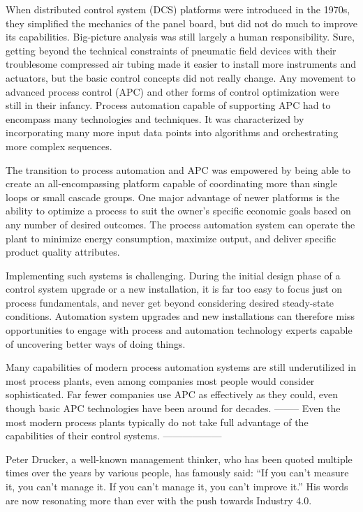 When distributed control system (DCS) platforms were introduced in the 1970s, they simplified the mechanics of the panel board, but did not do much to improve its capabilities. Big-picture analysis was still largely a human responsibility. Sure, getting beyond the technical constraints of pneumatic field devices with their troublesome compressed air tubing made it easier to install more instruments and actuators, but the basic control concepts did not really change. Any movement to advanced process control (APC) and other forms of control optimization were still in their infancy. Process automation capable of supporting APC had to encompass many technologies and techniques. It was characterized by incorporating many more input data points into algorithms and orchestrating more complex sequences.


The transition to process automation and APC was empowered by being able to create an all-encompassing platform capable of coordinating more than single loops or small cascade groups. One major advantage of newer platforms is the ability to optimize a process to suit the owner’s specific economic goals based on any number of desired outcomes. The process automation system can operate the plant to minimize energy consumption, maximize output, and deliver specific product quality attributes.

Implementing such systems is challenging. During the initial design phase of a control system upgrade or a new installation, it is far too easy to focus just on process fundamentals, and never get beyond considering desired steady-state conditions. Automation system upgrades and new installations can therefore miss opportunities to engage with process and automation technology experts capable of uncovering better ways of doing things.

Many capabilities of modern process automation systems are still underutilized in most process plants, even among companies most people would consider sophisticated. Far fewer companies use APC as effectively as they could, even though basic APC technologies have been around for decades. -------- Even the most modern process plants typically do not take full advantage of the capabilities of their control systems. ------------------

Peter Drucker, a well-known management thinker, who has been quoted multiple times over the years by various people, has famously said: “If you can't measure it, you can't manage it. If you can't manage it, you can't improve it.” His words are now resonating more than ever with the push towards Industry 4.0.

